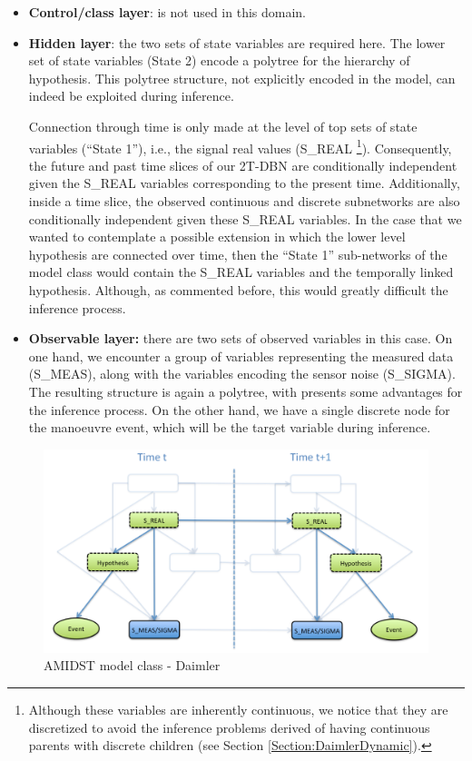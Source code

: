 \begin{itemize}
\item \textbf{Control/class layer}: is not used in this domain.

\item \textbf{Hidden layer}: the two sets of state variables are required here. The lower set of state variables (State 2) encode a polytree \cite{JensenNielsen2007} for the hierarchy of hypothesis. This polytree structure, not explicitly encoded in the model, can indeed be exploited during inference.


Connection through time is only made at the level of top sets of state variables (``State 1''), i.e., the signal real values (S\_REAL \footnote{Although these variables are inherently continuous, we notice that they are discretized to avoid the inference problems derived of having continuous parents with discrete children (see Section \ref{Section:DaimlerDynamic}).}). Consequently, the future and past time slices of our 2T-DBN are conditionally independent given the S\_REAL variables corresponding to the present time. Additionally, inside a time slice, the observed continuous and discrete subnetworks are also conditionally independent given these S\_REAL variables. In the case that we wanted to contemplate a possible extension in which the lower level hypothesis are connected over time, then the ``State 1'' sub-networks of the model class would contain the S\_REAL variables and the temporally linked hypothesis. Although, as commented before, this would greatly difficult the inference process. 

\item \textbf{Observable layer:} there are two sets of observed variables in this case. On one hand, we encounter a group of variables representing the measured data (S\_MEAS), along with the variables encoding the sensor noise (S\_SIGMA). The resulting structure is again a polytree, with presents some advantages for the inference process. On the other hand, we have a single discrete node for the manoeuvre event, which will be the target variable during inference. 
\end{itemize}


\begin{figure}[ht!]
\begin{center}
\includegraphics[scale=0.39]{./figures/AMIDSTModelClassDaimler}
\caption{\label{Figure:AMIDSTModelClassDaimler} AMIDST model class - Daimler}
\end{center}
\end{figure}

